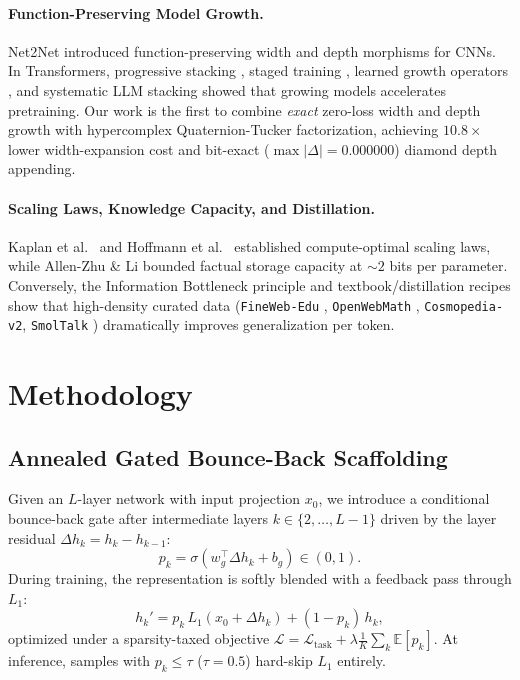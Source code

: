\documentclass[10pt,twocolumn]{article}
\newcommand{\citep}[1]{\cite{#1}}
\begin{document}
\paragraph{Function-Preserving Model Growth.} Net2Net \citep{chen2016net2net} introduced function-preserving width and depth morphisms for CNNs. In Transformers, progressive stacking \citep{gong2019efficient}, staged training \citep{shen2022staged}, learned growth operators \citep{wang2023learning}, and systematic LLM stacking \citep{du2024stacking} showed that growing models accelerates pretraining. Our work is the first to combine \emph{exact} zero-loss width and depth growth with hypercomplex Quaternion-Tucker factorization, achieving $10.8\times$ lower width-expansion cost and bit-exact ($\max|\Delta|=0.000000$) diamond depth appending.

\paragraph{Scaling Laws, Knowledge Capacity, and Distillation.} Kaplan et al.\ \citep{kaplan2020scaling} and Hoffmann et al.\ \citep{hoffmann2022training} established compute-optimal scaling laws, while Allen-Zhu \& Li \citep{allenzhu2024physics} bounded factual storage capacity at $\sim 2$ bits per parameter. Conversely, the Information Bottleneck principle \citep{tishby2015deep} and textbook/distillation recipes \citep{hinton2015distilling, kim2016sequence, gunasekar2023textbooks, allal2025smollm2} show that high-density curated data (\texttt{FineWeb-Edu} \citep{penedo2024fineweb}, \texttt{OpenWebMath} \citep{paster2023openwebmath}, \texttt{Cosmopedia-v2}, \texttt{SmolTalk} \citep{allal2025smollm2}) dramatically improves generalization per token.

\section{Methodology}

\subsection{Annealed Gated Bounce-Back Scaffolding}
Given an $L$-layer network with input projection $x_0$, we introduce a conditional bounce-back gate after intermediate layers $k \in \{2, \dots, L-1\}$ driven by the layer residual $\Delta h_k = h_k - h_{k-1}$:
\begin{equation}
    p_k = \sigma\!\left(w_g^\top \Delta h_k + b_g\right) \in (0, 1).
\end{equation}
During training, the representation is softly blended with a feedback pass through $L_1$:
\begin{equation}
    h_k' = p_k \, L_1(x_0 + \Delta h_k) + (1 - p_k) \, h_k,
\end{equation}
optimized under a sparsity-taxed objective $\mathcal{L} = \mathcal{L}_{\text{task}} + \lambda \frac{1}{K}\sum_k \mathbb{E}[p_k]$. At inference, samples with $p_k \le \tau$ ($\tau=0.5$) hard-skip $L_1$ entirely.
\end{document}
